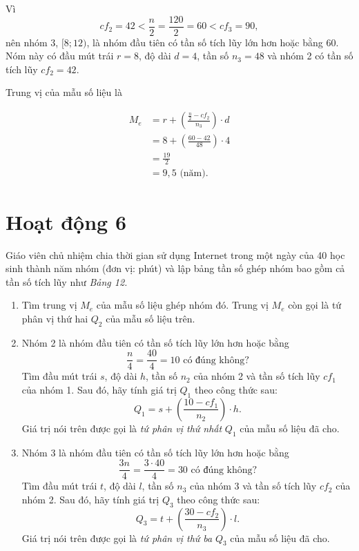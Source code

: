 \documentclass[
  letterpaper,
  DIV=11,
  numbers=noendperiod]{scrartcl}
\begin{document}
Vì \[
    cf_2 = 42 < \frac{n}{2} = \frac{120}{2} = 60 < cf_3 = 90, 
\] nên nhóm 3, \([8;12)\), là nhóm đầu tiên có tần số tích lũy lớn hơn
hoặc bằng 60. Nóm này có đầu mút trái \(r=8\), độ dài \(d=4\), tần số
\(n_3=48\) và nhóm 2 có tần số tích lũy \(cf_2 = 42\).

Trung vị của mẫu số liệu là

\begin{align*}
    M_e
        & = r + \left ( \frac{\frac{n}{2} - cf_2}{n_3} \right )\cdot d \\
        & = 8 + \left (\frac{60 - 42}{48}\right)\cdot 4 \\
        & = \frac{19}{2} \\
        & = 9,5 \text{ (năm)}.
\end{align*}

\section*{Hoạt động 6}

Giáo viên chủ nhiệm chia thời gian sử dụng Internet trong một ngày của
40 học sinh thành năm nhóm (đơn vị: phút) và lập bảng tần số ghép nhóm
bao gồm cả tần số tích lũy như \emph{Bảng 12.}

\begin{enumerate}
\def\labelenumi{\alph{enumi}.}
\item
  Tìm trung vị \(M_e\) của mẫu số liệu ghép nhóm đó. Trung vị \(M_e\)
  còn gọi là tứ phân vị thứ hai \(Q_2\) của mẫu số liệu trên.
\item
  Nhóm 2 là nhóm đầu tiên có tần số tích lũy lớn hơn hoặc bằng \[
   \frac{n}{4} = \frac{40}{4} = 10 \text{ có đúng không?}
  \] Tìm đầu mút trái \(s\), độ dài \(h\), tần số \(n_2\) của nhóm 2 và
  tần số tích lũy \(cf_1\) của nhóm 1. Sau đó, hãy tính giá trị \(Q_1\)
  theo công thức sau: \[
   Q_1 = s + \left (\frac{10-cf_1}{n_2}\right)\cdot h.
  \] Giá trị nói trên được gọi là \emph{tứ phân vị thứ nhất} \(Q_1\) của
  mẫu số liệu đã cho.
\item
  Nhóm 3 là nhóm đầu tiên có tần số tích lũy lớn hơn hoặc bằng \[
   \frac{3n}{4} = \frac{3\cdot 40}{4} = 30 \text{ có đúng không?}
  \] Tìm đầu mút trái \(t\), độ dài \(l\), tần số \(n_3\) của nhóm 3 và
  tần số tích lũy \(cf_2\) của nhóm 2. Sau đó, hãy tính giá trị \(Q_3\)
  theo công thức sau: \[
   Q_3 = t + \left (\frac{30-cf_2}{n_3}\right)\cdot l.
  \] Giá trị nói trên được gọi là \emph{tứ phân vị thứ ba} \(Q_3\) của
  mẫu số liệu đã cho.
\end{enumerate}
\end{document}
